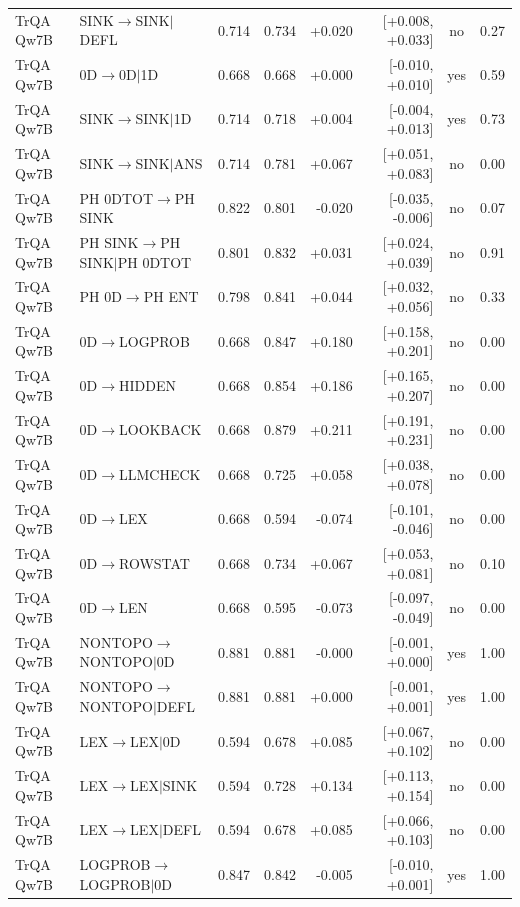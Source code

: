 \begin{longtable}{llrrrrcc}
TrQA Qw7B & SINK$\to$SINK$\mid$DEFL & 0.714 & 0.734 & +0.020 & [+0.008, +0.033] & no & 0.27 \\
TrQA Qw7B & 0D$\to$0D$\mid$1D & 0.668 & 0.668 & +0.000 & [-0.010, +0.010] & yes & 0.59 \\
TrQA Qw7B & SINK$\to$SINK$\mid$1D & 0.714 & 0.718 & +0.004 & [-0.004, +0.013] & yes & 0.73 \\
TrQA Qw7B & SINK$\to$SINK$\mid$ANS & 0.714 & 0.781 & +0.067 & [+0.051, +0.083] & no & 0.00 \\
TrQA Qw7B & PH 0DTOT$\to$PH SINK & 0.822 & 0.801 & -0.020 & [-0.035, -0.006] & no & 0.07 \\
TrQA Qw7B & PH SINK$\to$PH SINK$\mid$PH 0DTOT & 0.801 & 0.832 & +0.031 & [+0.024, +0.039] & no & 0.91 \\
TrQA Qw7B & PH 0D$\to$PH ENT & 0.798 & 0.841 & +0.044 & [+0.032, +0.056] & no & 0.33 \\
TrQA Qw7B & 0D$\to$LOGPROB & 0.668 & 0.847 & +0.180 & [+0.158, +0.201] & no & 0.00 \\
TrQA Qw7B & 0D$\to$HIDDEN & 0.668 & 0.854 & +0.186 & [+0.165, +0.207] & no & 0.00 \\
TrQA Qw7B & 0D$\to$LOOKBACK & 0.668 & 0.879 & +0.211 & [+0.191, +0.231] & no & 0.00 \\
TrQA Qw7B & 0D$\to$LLMCHECK & 0.668 & 0.725 & +0.058 & [+0.038, +0.078] & no & 0.00 \\
TrQA Qw7B & 0D$\to$LEX & 0.668 & 0.594 & -0.074 & [-0.101, -0.046] & no & 0.00 \\
TrQA Qw7B & 0D$\to$ROWSTAT & 0.668 & 0.734 & +0.067 & [+0.053, +0.081] & no & 0.10 \\
TrQA Qw7B & 0D$\to$LEN & 0.668 & 0.595 & -0.073 & [-0.097, -0.049] & no & 0.00 \\
TrQA Qw7B & NONTOPO$\to$NONTOPO$\mid$0D & 0.881 & 0.881 & -0.000 & [-0.001, +0.000] & yes & 1.00 \\
TrQA Qw7B & NONTOPO$\to$NONTOPO$\mid$DEFL & 0.881 & 0.881 & +0.000 & [-0.001, +0.001] & yes & 1.00 \\
TrQA Qw7B & LEX$\to$LEX$\mid$0D & 0.594 & 0.678 & +0.085 & [+0.067, +0.102] & no & 0.00 \\
TrQA Qw7B & LEX$\to$LEX$\mid$SINK & 0.594 & 0.728 & +0.134 & [+0.113, +0.154] & no & 0.00 \\
TrQA Qw7B & LEX$\to$LEX$\mid$DEFL & 0.594 & 0.678 & +0.085 & [+0.066, +0.103] & no & 0.00 \\
TrQA Qw7B & LOGPROB$\to$LOGPROB$\mid$0D & 0.847 & 0.842 & -0.005 & [-0.010, +0.001] & yes & 1.00 \\

\end{longtable}
